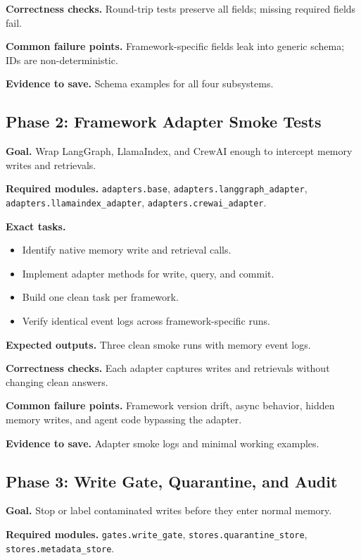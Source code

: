 \documentclass[11pt,oneside]{report}
\begin{document}
\textbf{Correctness checks.} Round-trip tests preserve all fields; missing required fields fail.

\textbf{Common failure points.} Framework-specific fields leak into generic schema; IDs are
non-deterministic.

\textbf{Evidence to save.} Schema examples for all four subsystems.

\subsection{Phase 2: Framework Adapter Smoke Tests}

\textbf{Goal.} Wrap LangGraph, LlamaIndex, and CrewAI enough to intercept memory writes and
retrievals.

\textbf{Required modules.} \texttt{adapters.base}, \texttt{adapters.langgraph\_adapter},
\texttt{adapters.llamaindex\_adapter}, \texttt{adapters.crewai\_adapter}.

\textbf{Exact tasks.}
\begin{itemize}
  \item Identify native memory write and retrieval calls.
  \item Implement adapter methods for write, query, and commit.
  \item Build one clean task per framework.
  \item Verify identical event logs across framework-specific runs.
\end{itemize}

\textbf{Expected outputs.} Three clean smoke runs with memory event logs.

\textbf{Correctness checks.} Each adapter captures writes and retrievals without changing clean
answers.

\textbf{Common failure points.} Framework version drift, async behavior, hidden memory writes, and
agent code bypassing the adapter.

\textbf{Evidence to save.} Adapter smoke logs and minimal working examples.

\subsection{Phase 3: Write Gate, Quarantine, and Audit}

\textbf{Goal.} Stop or label contaminated writes before they enter normal memory.

\textbf{Required modules.} \texttt{gates.write\_gate}, \texttt{stores.quarantine\_store},
\texttt{stores.metadata\_store}.
\end{document}
